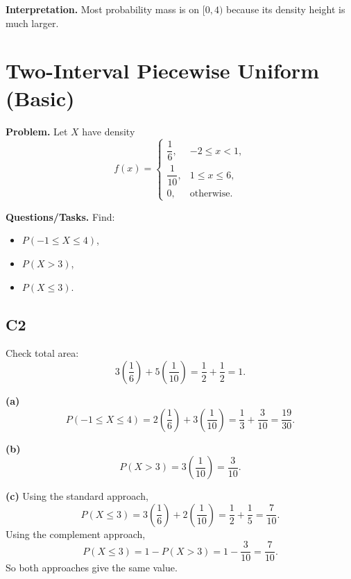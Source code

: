 
\textbf{Interpretation.}
Most probability mass is on $[0,4)$ because its density height is much larger.

\section{Two-Interval Piecewise Uniform (Basic)}

\textbf{Problem.}
Let $X$ have density
\[
f(x)=
\begin{cases}
	\dfrac{1}{6}, & -2\le x<1,\\
	\dfrac{1}{10}, & 1\le x\le 6,\\
	0, & \text{otherwise.}
\end{cases}
\]

\textbf{Questions/Tasks.}
Find:
\begin{itemize}
	\item[(a)] $P(-1\le X\le 4)$,
	\item[(b)] $P(X>3)$,
	\item[(c)] $P(X\le 3)$.
\end{itemize}

\subsection*{C2}
Check total area:
\[
3\left(\frac{1}{6}\right)+5\left(\frac{1}{10}\right)=\frac{1}{2}+\frac{1}{2}=1.
\]


\textbf{(a)}
\[
P(-1\le X\le 4)=2\left(\frac{1}{6}\right)+3\left(\frac{1}{10}\right)=\frac{1}{3}+\frac{3}{10}=\frac{19}{30}.
\]


\textbf{(b)}
\[
P(X>3)=3\left(\frac{1}{10}\right)=\frac{3}{10}.
\]


\textbf{(c)} Using the standard approach,
\[
P(X\le 3)=3\left(\frac{1}{6}\right)+2\left(\frac{1}{10}\right)=\frac{1}{2}+\frac{1}{5}=\frac{7}{10}.
\]
Using the complement approach,
\[
P(X\le 3)=1-P(X>3)=1-\frac{3}{10}=\frac{7}{10}.
\]
So both approaches give the same value.


